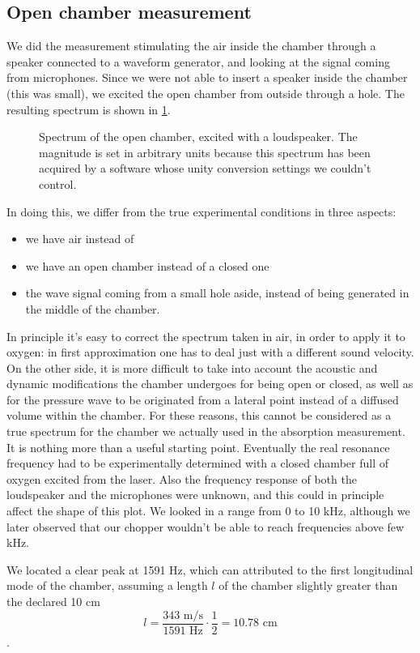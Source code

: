 	\subsection{Open chamber measurement}
We did the measurement stimulating the air inside the chamber through a speaker connected to a waveform generator, and looking at the signal coming from microphones. Since we were not able to insert a speaker inside the chamber (this was small), we excited the open chamber from outside through a hole. The resulting spectrum is shown in \cref{chamberplot}.
\begin{figure}[!t]\centering

\caption{Spectrum of the open chamber, excited with a loudspeaker. The magnitude is set in arbitrary units because this spectrum has been acquired by a software whose unity conversion settings we couldn't control.}
\label{chamberplot}
\end{figure}
In doing this, we differ from the true experimental conditions in three aspects:
\begin{itemize}
\item we have air instead of 
\item we have an open chamber instead of a closed one 
\item the wave signal coming from a small hole aside, instead of being generated in the middle of the chamber.
\end{itemize}

In principle it's easy to correct the spectrum taken in air, in order to apply it to oxygen: in first approximation one has to deal just with a different sound velocity. On the other side, it is more difficult to take into account the acoustic and dynamic modifications the chamber undergoes for being open or closed, as well as for the pressure wave to be originated from a lateral point instead of a diffused volume within the chamber. For these reasons, this cannot be considered as a true spectrum for the chamber we actually used in the absorption measurement. It is nothing more than a useful starting point. Eventually the real resonance frequency had to be experimentally determined with a closed chamber full of oxygen excited from the laser. Also the frequency response of both the loudspeaker and the microphones were unknown, and this could in principle affect the shape of this plot. We looked in a range from 0 to 10 kHz, although we later observed that our chopper wouldn't be able to reach frequencies above few kHz.

We located a clear peak at 1591 Hz, which can attributed to the first longitudinal mode of the chamber, assuming a length $l$ of the chamber slightly greater than the declared 10 cm$$l=\frac{343\mbox{ m/s}}{1591\mbox{ Hz}}\cdot\frac{1}{2}=10.78\mbox{ cm}$$.

